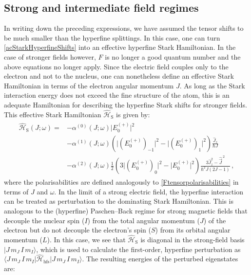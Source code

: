 \documentclass[../Thesis-IJspeert.tex]{subfiles}
\begin{document}
\subsection{Strong and intermediate field regimes}
In writing down the preceding expressions, we have assumed the tensor shifts to be much smaller than the hyperfine splittings. In this case, one can turn \autoref{acStarkHyperfineShifts} into an effective hyperfine Stark Hamiltonian. In the case of stronger fields however, $F$ is no longer a good quantum number and the above equations no longer apply. Since the electric field couples only to the electron and not to the nucleus, one can nonetheless define an effective Stark Hamiltonian in terms of the electron angular momentum $J$. As long as the Stark interaction energy does not exceed the fine structure of the atom, this is an adequate Hamiltonian for describing the hyperfine Stark shifts for stronger fields. This effective Stark Hamiltonian $\hat{\mathcal{H}}_\mathrm{S}$ is given by:
\begin{align}
\label{effectivestarkhamiltonian}
\begin{split}
\hat{\mathcal{H}}_\mathrm{S}\left(J;\omega\right) = &- \alpha^{(0)}\left(J;\omega\right) \lvert E_0^{(+)}\rvert ^2 \\&- \alpha^{(1)} \left(J;\omega\right)   \left( \lvert (E_0^{(+)})_{-1}\rvert ^2 - \lvert (E_0^{(+)})_{1}\rvert ^2  \right)    \frac{\hat{J}_z}{\hbar J}   \\&- \alpha^{(2)}\left(J;\omega\right)\frac{1}{2}\left(3\lvert (E_{0}^{(+)})_0 \rvert ^2 - \lvert E_0^{(+)}\rvert ^2 \right) \frac{3{\hat{J}}_z^2-\hat{\vec{J}}^{\,2}}{\hbar^2 J\left(2J-1\right)} \,,
\end{split}
\end{align}
where the polarisabilities are defined analogously to \autoref{Ftensorpolarisabilities} in terms of $J$ and $\omega$. In the limit of a strong electric field, the hyperfine interaction can be treated as perturbation to the dominating Stark Hamiltonian. This is analogous to the (hyperfine) Paschen--Back regime for strong magnetic fields that decouple the nuclear spin ($I$) from the total angular momentum ($J$) of the electron but do not decouple the electron's spin ($S$) from its orbital angular momentum ($L$). In this case, we see that $\hat{\mathcal{H}}_\mathrm{S}$ is diagonal in the strong-field basis $\vert J\, m_J\, I\, m_I\rangle$, which is used to calculate the first-order, hyperfine perturbation as $\langle J\, m_J\, I\, m_I \vert \hat{\mathcal{H}}_{\mathrm{hfs}} \vert J\, m_J\, I\, m_I\rangle$. The resulting energies of the perturbed eigenstates are:
\end{document}
